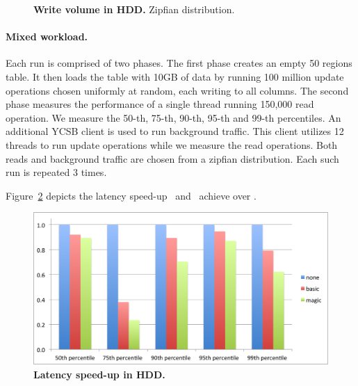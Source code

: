 {\begin{figure}[htb]
\caption{{\bf  Write volume in HDD.} Zipfian distribution.
}
\label{fig:volume-hdd-uniform}
\end{figure}



\paragraph{Mixed workload.}
Each run is comprised of two phases. 
The first phase creates an empty 50 regions table. It then loads the table with 10GB of data by running 100 million update operations chosen uniformly at random, each writing to all columns. 
The second phase measures the performance of a single thread running 150,000 read operation. 
We measure the 50-th, 75-th, 90-th, 95-th and 99-th percentiles.
An additional YCSB client is used to run background traffic. 
This client utilizes 12 threads to run update operations while we measure the read operations. 
Both reads and background traffic are chosen from a zipfian distribution.
Each such run is repeated 3 times. 

Figure~\ref{fig:latency-speedup-hdd} depicts the latency speed-up \basic\ and \magic\ achieve over \none.

\begin{figure}[htb]
\includegraphics[width=\figw]{Figs/latency-speedup-hdd.png}
\caption{{\bf Latency speed-up in HDD.} 
}
\label{fig:latency-speedup-hdd}
\end{figure}

}
